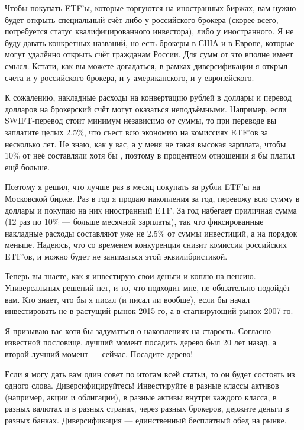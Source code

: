Чтобы покупать ETF'ы, которые торгуются на иностранных биржах, вам нужно будет 
открыть специальный счёт либо у российского брокера (скорее всего, потребуется 
статус квалифицированного инвестора), либо у иностранного. Я не буду давать 
конкретных названий, но есть брокеры в США и в Европе, которые могут удалённо 
открыть счёт гражданам России. Для сумм от  это вполне имеет 
смысл. Кстати, как вы можете догадаться, в рамках диверсификации я открыл счета 
и у российского брокера, и у американского, и у европейского.

К сожалению, накладные расходы на конвертацию рублей в доллары и перевод 
долларов на брокерский счёт могут оказаться неподъёмными. Например, если
SWIFT-перевод стоит минимум  независимо от суммы, то при переводе 
 вы заплатите целых 2.5\%, что съест всю экономию на комиссиях 
ETF'ов за несколько лет. Не знаю, как у вас, а у меня не такая высокая зарплата, 
чтобы 10\% от неё составляли хотя бы , поэтому в процентном 
отношении я бы платил ещё больше.

Поэтому я решил, что лучше раз в месяц покупать за рубли ETF'ы на Московской 
бирже. Раз в год я продаю накопления за год, перевожу всю сумму в доллары и 
покупаю на них иностранный ETF. За год набегает приличная сумма (12 раз по 10\% 
--- больше месячной зарплаты), так что фиксированные накладные расходы 
составляют уже не 2.5\% от суммы инвестиций, а на порядок меньше. Надеюсь, что 
со временем конкуренция снизит комиссии российских ETF'ов, и можно будет не 
заниматься этой эквилибристикой.

Теперь вы знаете, как я инвестирую свои деньги и коплю на пенсию. Универсальных 
решений нет, и то, что подходит мне, не обязательно подойдёт вам. Кто знает, 
что бы я писал (и писал ли вообще), если бы начал инвестировать не в растущий 
рынок 2015-го, а в стагнирующий рынок 2007-го.

Я призываю вас хотя бы задуматься о накоплениях на старость. Согласно известной 
пословице, лучший момент посадить дерево был 20 лет назад, а второй лучший 
момент --- сейчас. Посадите дерево!

\clearpage
{}

Если я могу дать вам один совет по итогам всей статьи, то он будет состоять из 
одного слова. Диверсифицируйтесь! Инвестируйте в разные классы активов 
(например, акции и облигации), в разные активы внутри каждого класса, в разных
валютах и в разных странах, через разных брокеров, держите деньги в разных 
банках. Диверсификация --- единственный бесплатный обед на рынке.

